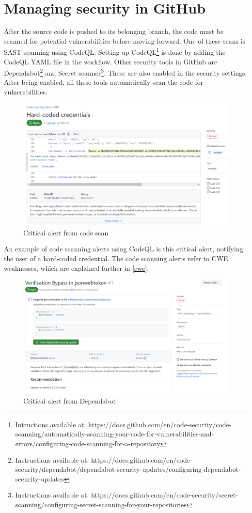 \section{Managing security in GitHub}
After the source code is pushed to its belonging branch, the code must be scanned for potential vulnerabilities before moving forward. One of these scans is SAST scanning using CodeQL. Setting up CodeQL\footnote{Intructions available at: https://docs.github.com/en/code-security/code-scanning/automatically-scanning-your-code-for-vulnerabilities-and-errors/configuring-code-scanning-for-a-repository} is done by adding the CodeQL YAML file in the workflow. Other security tools in GitHub are Dependabot\footnote{Instructions available at: https://docs.github.com/en/code-security/dependabot/dependabot-security-updates/configuring-dependabot-security-updates} and Secret scanner\footnote{Instructions available at: https://docs.github.com/en/code-security/secret-scanning/configuring-secret-scanning-for-your-repositories}. These are also enabled in the security settings. After being enabled, all these tools automatically scan the code for vulnerabilities.

\begin{figure}[H]
    \centering
    \includegraphics[width=0.8\columnwidth]{Images/codescan.png}
    \caption{Critical alert from code scan}
    \label{fig: Critical alert from code scan}
\end{figure}

An example of code scanning alerts using CodeQL is this critical alert, notifying the user of a hard-coded credential. The code scanning alerts refer to CWE weaknesses, which are explained further in \ref{cwe}.

\vspace{2mm}
\begin{figure}[H]
    \centering
    \includegraphics[width=0.8\columnwidth]{Images/dependabotalert.png}
    \caption{Critical alert from Dependabot}
    \label{fig: Critical alert from Dependabot}
\end{figure}

